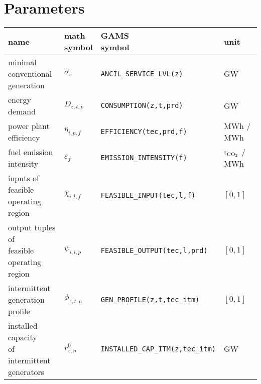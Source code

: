 \documentclass[11pt,a4paper]{article}
\begin{document}
\section{Parameters} \label{parameters}
\begin{tabular}{l l l l}
\textbf{name} & \makecell[l]{\textbf{math} \\ \textbf{symbol}} & \makecell[l]{\textbf{GAMS} \\\textbf{symbol}} & \textbf{unit} \\
\hline \hline
\makecell[l]{minimal \\conventional \\generation} & $\sigma_{z}$ & \texttt{ANCIL\_SERVICE\_LVL(z)} & GW \\ \hline
energy demand & $D_{z,t,p}$ & \texttt{CONSUMPTION(z,t,prd)} & GW \\ \hline
\makecell[l]{power plant \\efficiency} & $\eta_{i,p,f}$ & \texttt{EFFICIENCY(tec,prd,f)} & MWh / MWh\\ \hline
\makecell[l]{fuel emission \\intensity} & $\varepsilon_{f}$ & \texttt{EMISSION\_INTENSITY(f)} & $\text{t}_{\ce{CO2}}$ / MWh\\ \hline
\makecell[l]{inputs of \\feasible operating \\region} & $\chi_{i,l,f}$ & \texttt{FEASIBLE\_INPUT(tec,l,f)} & $[0,1]$ \\ \hline
\makecell[l]{output tuples of \\feasible operating \\region} & $\psi_{i,l,p}$ & \texttt{FEASIBLE\_OUTPUT(tec,l,prd)} & $[0,1]$ \\ \hline
\makecell[l]{intermittent \\generation profile} & $\phi_{z,t,n}$ & \texttt{GEN\_PROFILE(z,t,tec\_itm)} & $[0,1]$ \\ \hline
\makecell[l]{installed capacity \\of intermittent \\generators} & $\bar{r}^{0}_{z,n}$ & \texttt{INSTALLED\_CAP\_ITM(z,tec\_itm)} & GW \\ \hline

\end{tabular}
\end{document}
